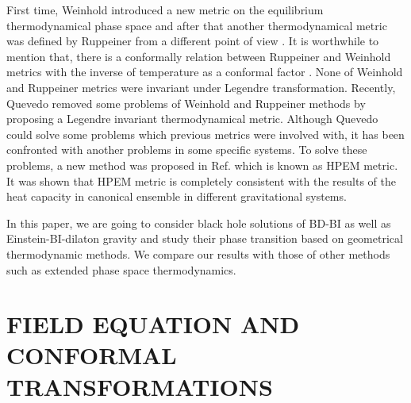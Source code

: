 \documentclass[aps,onecolumn ]{revtex4}
\begin{document}
First time, Weinhold introduced a new metric on the equilibrium
thermodynamical phase space \cite{Weinhold1,Weinhold2} and after
that another thermodynamical metric was defined by Ruppeiner from
a different point of view \cite{Ruppeiner1,Ruppeiner2}. It is
worthwhile to mention that, there is a conformally relation
between Ruppeiner and Weinhold metrics with the inverse of
temperature as a conformal factor \cite{Salamon}. None of Weinhold
and Ruppeiner metrics were invariant under Legendre
transformation. Recently, Quevedo \cite{Quevedo1,Quevedo2} removed
some problems of Weinhold and Ruppeiner methods by proposing a
Legendre invariant thermodynamical metric. Although Quevedo could
solve some problems which previous metrics were involved with, it
has been confronted with another problems in some specific
systems. To solve these problems, a new method was proposed in
Ref. \cite{HPEM1,HPEM2,HPEM3} which is known as HPEM metric. It
was shown that HPEM metric is completely consistent with the
results of the heat capacity in canonical ensemble in different
gravitational systems.

In this paper, we are going to consider black hole solutions of BD-BI as
well as Einstein-BI-dilaton gravity and study their phase transition based
on geometrical thermodynamic methods. We compare our results with those of
other methods such as extended phase space thermodynamics.


\section{FIELD EQUATION AND CONFORMAL TRANSFORMATIONS \label{FE}}
\end{document}
